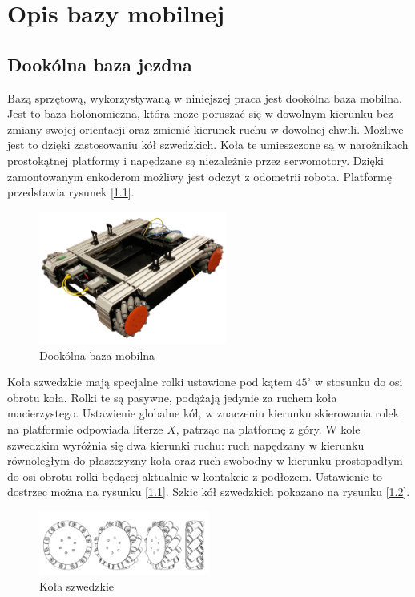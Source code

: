 \chapter{Opis bazy mobilnej}

\section{Dookólna baza jezdna}

Bazą sprzętową, wykorzystywaną w niniejszej praca jest dookólna baza mobilna. Jest to baza holonomiczna, która może poruszać się w dowolnym kierunku bez zmiany swojej orientacji oraz zmienić kierunek ruchu w dowolnej chwili. Możliwe jest to dzięki zastosowaniu kół szwedzkich. Koła te umieszczone są w narożnikach prostokątnej platformy i napędzane są niezależnie przez serwomotory. Dzięki zamontowanym enkoderom możliwy jest odczyt z odometrii robota. Platformę przedstawia rysunek [\ref{fig:omnivelma}]. \\

\begin{figure}[H]
	\centering
	\includegraphics[width=0.55\textwidth]{gfx/omnivelma.png}
	\caption{Dookólna baza mobilna \cite{omnivelma}}
	\label{fig:omnivelma}
\end{figure}

Koła szwedzkie mają specjalne rolki ustawione pod kątem $45^{\circ}$ w stosunku do osi obrotu koła. Rolki te są pasywne, podążają jedynie za ruchem koła macierzystego. Ustawienie globalne kół, w znaczeniu kierunku skierowania rolek na platformie odpowiada literze $X$, patrząc na platformę z góry. W kole szwedzkim wyróżnia się dwa kierunki ruchu: ruch napędzany w kierunku równoległym do płaszczyzny koła oraz ruch swobodny w kierunku prostopadłym do osi obrotu rolki będącej aktualnie w kontakcie z podłożem. Ustawienie to dostrzec można na rysunku [\ref{fig:omnivelma}]. Szkic kół szwedzkich pokazano na rysunku [\ref{fig:wheels}].

\begin{figure}[H]
	\centering
	\includegraphics[width=0.5\textwidth]{gfx/wheels.png}
	\caption{Koła szwedzkie \cite{omnivelma}}
	\label{fig:wheels}
\end{figure}

